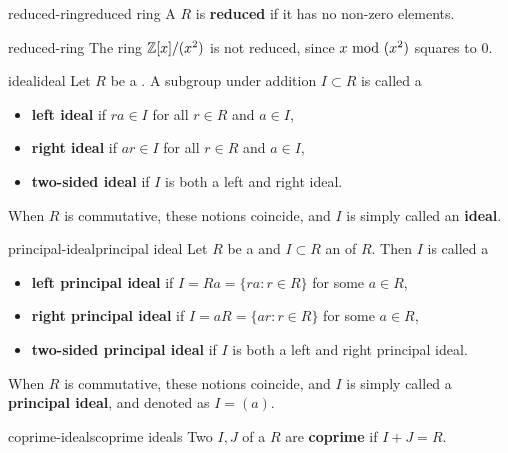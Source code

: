 \begin{topic}{reduced-ring}{reduced ring}
    A  $R$ is \textbf{reduced} if it has no non-zero  elements.
\end{topic}

\begin{example}{reduced-ring}
    The ring $\mathbb{Z}[x] / (x^2)$ is not reduced, since $x \textup{ mod } (x^2)$ squares to $0$.
\end{example}

\begin{topic}{ideal}{ideal}
    Let $R$ be a . A subgroup under addition $I \subset R$ is called a
    \begin{itemize}
        \item \textbf{left ideal} if $ra \in I$  for all $r \in R$ and $a \in I$,
        \item \textbf{right ideal} if $ar \in I$ for all $r \in R$ and $a \in I$,
        \item \textbf{two-sided ideal} if $I$ is both a left and right ideal.
    \end{itemize}
    When $R$ is commutative, these notions coincide, and $I$ is simply called an \textbf{ideal}.
\end{topic}

\begin{topic}{principal-ideal}{principal ideal}
    Let $R$ be a  and $I \subset R$ an  of $R$. Then $I$ is called a
    \begin{itemize}
        \item \textbf{left principal ideal} if $I = Ra = \{ ra : r \in R \}$ for some $a \in R$,
        \item \textbf{right principal ideal} if $I = aR = \{ ar : r \in R \}$ for some $a \in R$,
        \item \textbf{two-sided principal ideal} if $I$ is both a left and right principal ideal.
    \end{itemize}
    When $R$ is commutative, these notions coincide, and $I$ is simply called a \textbf{principal ideal}, and denoted as $I = (a)$.
\end{topic}

\begin{topic}{coprime-ideals}{coprime ideals}
    Two  $I, J$ of a  $R$ are \textbf{coprime} if $I + J = R$.
\end{topic}

